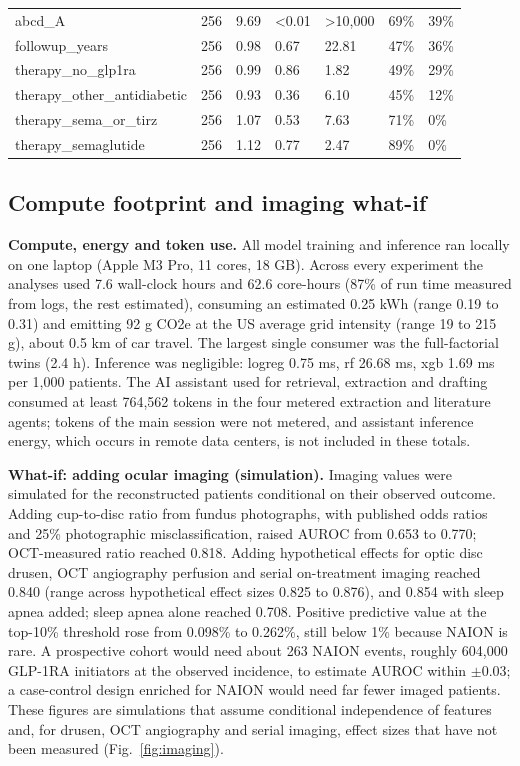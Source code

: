 \documentclass[journal]{IEEEtran}
\begin{document}
\begin{table}[!htbp]
{\begin{tabular}{lllllll}
abcd\_A & 256 & 9.69 & \textless0.01 & \textgreater10,000 & 69\% & 39\% \\
followup\_years & 256 & 0.98 & 0.67 & 22.81 & 47\% & 36\% \\
therapy\_no\_glp1ra & 256 & 0.99 & 0.86 & 1.82 & 49\% & 29\% \\
therapy\_other\_antidiabetic & 256 & 0.93 & 0.36 & 6.10 & 45\% & 12\% \\
therapy\_sema\_or\_tirz & 256 & 1.07 & 0.53 & 7.63 & 71\% & 0\% \\
therapy\_semaglutide & 256 & 1.12 & 0.77 & 2.47 & 89\% & 0\% \\
\bottomrule\end{tabular}}
\end{table}

\subsection{Compute footprint and imaging
what-if}\label{compute-footprint-and-imaging-what-if}

\textbf{Compute, energy and token use.} All model training and inference
ran locally on one laptop (Apple M3 Pro, 11 cores, 18 GB). Across every
experiment the analyses used 7.6 wall-clock hours and 62.6 core-hours
(87\% of run time measured from logs, the rest estimated), consuming an
estimated 0.25 kWh (range 0.19 to 0.31) and emitting 92 g CO2e at the US
average grid intensity (range 19 to 215 g), about 0.5 km of car travel.
The largest single consumer was the full-factorial twins (2.4 h).
Inference was negligible: logreg 0.75 ms, rf 26.68 ms, xgb 1.69 ms per
1,000 patients. The AI assistant used for retrieval, extraction and
drafting consumed at least 764,562 tokens in the four metered extraction
and literature agents; tokens of the main session were not metered, and
assistant inference energy, which occurs in remote data centers, is not
included in these totals.

\textbf{What-if: adding ocular imaging (simulation).} Imaging values
were simulated for the reconstructed patients conditional on their
observed outcome. Adding cup-to-disc ratio from fundus photographs, with
published odds ratios \cite{p42556433} and 25\% photographic
misclassification, raised AUROC from 0.653 to 0.770; OCT-measured ratio
reached 0.818. Adding hypothetical effects for optic disc drusen, OCT
angiography perfusion and serial on-treatment imaging reached 0.840
(range across hypothetical effect sizes 0.825 to 0.876), and 0.854 with
sleep apnea added; sleep apnea alone reached 0.708. Positive predictive
value at the top-10\% threshold rose from 0.098\% to 0.262\%, still
below 1\% because NAION is rare. A prospective cohort would need about
263 NAION events, roughly 604,000 GLP-1RA initiators at the observed
incidence, to estimate AUROC within \ensuremath{\pm}0.03; a case-control design
enriched for NAION would need far fewer imaged patients. These figures
are simulations that assume conditional independence of features and,
for drusen, OCT angiography and serial imaging, effect sizes that have
not been measured (Fig.~\ref{fig:imaging}).
\end{document}
